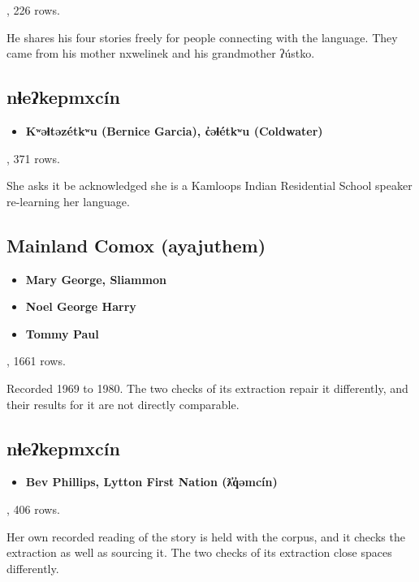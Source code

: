 \cite{src:LaFontaine-and-Janzen-2024}, 226 rows.

He shares his four stories freely for people connecting with the language. They came from his mother nxwelinek and his grandmother ʔústko.

\subsection{nɬeʔkepmxcín}

\begin{itemize}
\item \textbf{Kʷəɬtəzétkʷu (Bernice Garcia), c̓əɬétkʷu (Coldwater)}
\end{itemize}

\cite{src:Garcia-Hannon-and-Stacey-2024}, 371 rows.

She asks it be acknowledged she is a Kamloops Indian Residential School speaker re-learning her language.

\subsection{Mainland Comox (ayajuthem)}

\begin{itemize}
\item \textbf{Mary George, Sliammon}
\item \textbf{Noel George Harry}
\item \textbf{Tommy Paul}
\end{itemize}

\cite{src:John-Hamilton-Davis-2021}, 1661 rows.

Recorded 1969 to 1980. The two checks of its extraction repair it differently, and their results for it are not directly comparable.

\subsection{nɬeʔkepmxcín}

\begin{itemize}
\item \textbf{Bev Phillips, Lytton First Nation (ƛ̓q̓əmcín)}
\end{itemize}

\cite{src:Hall-and-Phillips-2025}, 406 rows.

Her own recorded reading of the story is held with the corpus, and it checks the extraction as well as sourcing it. The two checks of its extraction close spaces differently.

